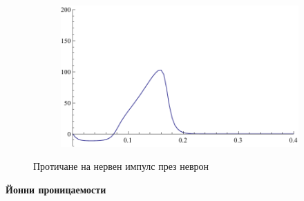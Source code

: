 \documentclass{article}
\numberwithin{equation}{section}
\begin{document}
\begin{figure}[H]
\begin{subfigure}[t]{0.3\textwidth}
        \end{subfigure}
        \begin{subfigure}[t]{0.3\textwidth}
            \includegraphics[width=\textwidth]{./schemas/Neuron3.pdf}
        \end{subfigure}
        \caption{Протичане на нервен импулс през неврон}\label{fig:neural_impulse}
    \end{figure}
    
    \vspace{5mm} %
    \textbf{Йонни проницаемости}
    
\end{document}

